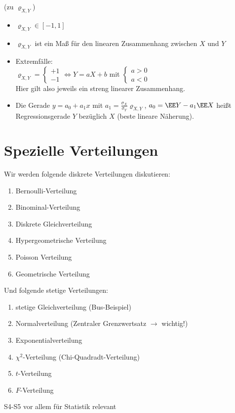  (zu $\varrho_{X,Y}$)
\begin{itemize}
\item $\varrho_{X,Y} \in [-1,1]$
\item $\varrho_{X,Y}$ ist ein Maß für den linearen Zusammenhang zwischen $X$ und $Y$
\item Extremfälle:\\
$\varrho_{X,Y}=\begin{cases}
+1\\
-1
\end{cases} \Leftrightarrow Y=aX+b$ mit $\begin{cases}
a > 0\\
a < 0
\end{cases}$\\
Hier gilt also jeweils ein streng linearer Zusammenhang.
\item Die Gerade $y=a_0+a_1 x$ mit $a_1 = \frac{\sigma_X}{\sigma_Y}\varrho_{X,Y}$, $a_0=\EE Y - a_1 \EE  X$ heißt Regressionsgerade $Y$ bezüglich $X$ (beste lineare Näherung).
\end{itemize} 

\section{Spezielle Verteilungen}
Wir werden folgende diskrete Verteilungen diskutieren:
\begin{enumerate}[label=(D\arabic*)]
\item Bernoulli-Verteilung
\item Binominal-Verteilung
\item Diskrete Gleichverteilung
\item Hypergeometrische Verteilung
\item Poisson Verteilung
\item Geometrische Verteilung
\end{enumerate}
Und folgende stetige Verteilungen:
\begin{enumerate}[label=(D\arabic*)]
\item stetige Gleichverteilung (Bus-Beispiel)
\item Normalverteilung (Zentraler Grenzwertsatz $\to$ wichtig!)
\item Exponentialverteilung
\item $\chi^2$-Verteilung (Chi-Quadradt-Verteilung)
\item $t$-Verteilung
\item $F$-Verteilung
\end{enumerate}
S4-S5 vor allem für Statistik relevant
